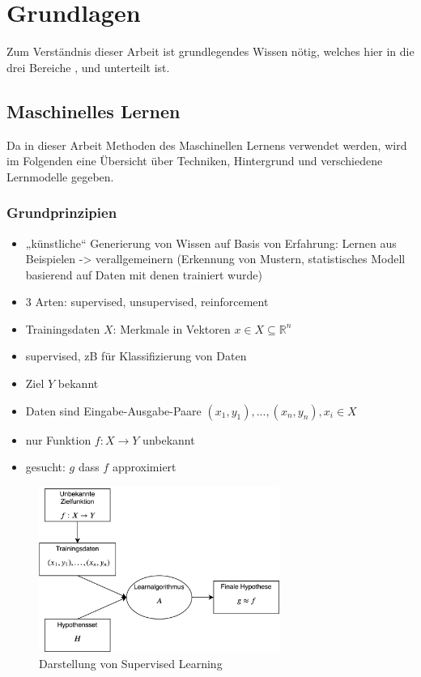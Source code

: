 \chapter{Grundlagen}\label{grundlagen}

Zum Verständnis dieser Arbeit ist grundlegendes Wissen nötig, welches hier in die drei Bereiche ,  und  unterteilt ist.


\section{Maschinelles Lernen}\label{ml-grundlagen}

Da in dieser Arbeit Methoden des Maschinellen Lernens verwendet werden, wird im Folgenden eine Übersicht über Techniken, Hintergrund und verschiedene Lernmodelle gegeben.

	\subsection{Grundprinzipien}
	
	\begin{itemize}
		\item „künstliche“ Generierung von Wissen auf Basis von Erfahrung: Lernen aus Beispielen -> verallgemeinern (Erkennung von Mustern, statistisches Modell basierend auf Daten mit denen trainiert wurde)
		\item 3 Arten: supervised, unsupervised, reinforcement
		\item Trainingsdaten $X$: Merkmale in Vektoren $x \in X \subseteq \mathbb{R}^n$
		\item supervised, zB für Klassifizierung von Daten
		\item Ziel $Y$ bekannt
		\item Daten sind Eingabe-Ausgabe-Paare $(x_1, y_1), ...,(x_n, y_n), x_i \in X$
		\item nur Funktion $f: X \to Y$ unbekannt
		\item gesucht: $g$ dass $f$ approximiert
	\end{itemize}
	
	\begin{figure}[H]
	\centering
		\includegraphics[width=0.7\textwidth]{pic/SupervisedLearning.png}
	\caption[Darstellung von Supervised Learning]{Darstellung von Supervised Learning}
	\label{fig:supervisedLearning}
	\end{figure}

